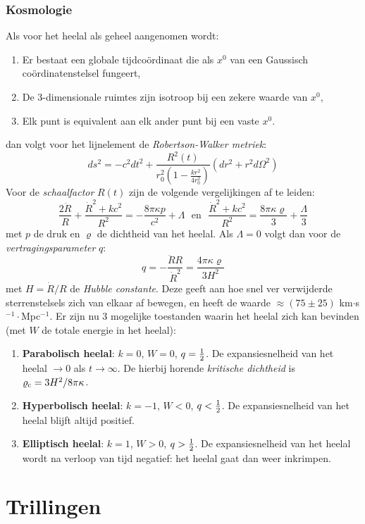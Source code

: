 \subsection{Kosmologie}
Als voor het heelal als geheel aangenomen wordt:
\begin{enumerate}
\item Er bestaat een globale tijdco\"ordinaat die als $x^0$ van een Gaussisch
      co\"ordinatenstelsel fungeert,
\item De 3-dimensionale ruimtes zijn isotroop bij een zekere waarde van $x^0$,
\item Elk punt is equivalent aan elk ander punt bij een vaste $x^0$.
\end{enumerate}
dan volgt voor het lijnelement de {\it Robertson-Walker metriek}:
\[
ds^2=-c^2dt^2+\frac{R^2(t)}{r_0^2\left(1-\displaystyle\frac{kr^2}{4r_0^2}\right)}(dr^2+r^2d\Omega^2)
\]
Voor de {\it schaalfactor} $R(t)$ zijn de volgende vergelijkingen af te
leiden:
\[
\frac{2\ddot{R}}{R}+\frac{\dot{R}^2+kc^2}{R^2}=-\frac{8\pi\kappa p}{c^2}+\Lambda
~~~\mbox{en}~~~
\frac{\dot{R}^2+kc^2}{R^2}=\frac{8\pi\kappa\varrho}{3}+\frac{\Lambda}{3}
\]
met $p$ de druk en $\varrho$ de dichtheid van het heelal. Als $\Lambda=0$
volgt dan voor de {\it vertragingsparameter} $q$:
\[
q=-\frac{\ddot{R}R}{\dot{R}^2}=\frac{4\pi\kappa\varrho}{3H^2}
\]
met $H=\dot{R}/R$ de {\it Hubble constante}. Deze geeft aan hoe snel ver
verwijderde sterrenstelsels zich van elkaar af bewegen, en heeft de waarde
$\approx(75\pm25)$ km$\cdot$s$^{-1}\cdot$Mpc$^{-1}$. Er zijn nu 3 mogelijke
toestanden waarin het heelal zich kan bevinden (met $W$ de totale energie in
het heelal):
\begin{enumerate}
\item {\bf Parabolisch heelal}: $k=0$, $W=0$, $q=\mbox{$\frac{1}{2}$}$. De expansiesnelheid
      van het heelal $\rightarrow0$ als $t\rightarrow\infty$. De hierbij
      horende {\it kritische dichtheid} is $\varrho_{\rm c}=3H^2/8\pi\kappa$.
\item {\bf Hyperbolisch heelal}: $k=-1$, $W<0$, $q<\mbox{$\frac{1}{2}$}$. De expansiesnelheid
      van het heelal blijft altijd positief.
\item {\bf Elliptisch heelal}: $k=1$, $W>0$, $q>\mbox{$\frac{1}{2}$}$. De expansiesnelheid
      van het heelal wordt na verloop van tijd negatief: het heelal gaat dan
      weer inkrimpen.
\end{enumerate}

\chapter{Trillingen}
